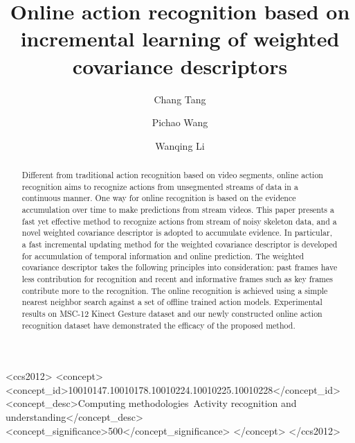 \documentclass[sigconf]{acmart}
\begin{document}
\title{Online action recognition based on incremental learning of weighted covariance descriptors}

\author{Chang Tang}

\author{Pichao Wang}

\author{Wanqing Li}





\begin{abstract}
Different from traditional action recognition based on video segments, online action recognition aims to recognize actions from unsegmented streams of data in a continuous manner.  One way for online recognition is based on the evidence accumulation over time to make predictions from stream videos. This paper presents a fast yet effective method to recognize actions from stream of noisy skeleton data, and a novel weighted covariance descriptor is adopted to accumulate evidence. In particular, a fast incremental updating method for the weighted covariance descriptor is developed for accumulation of temporal information and online prediction. The weighted covariance descriptor takes the following principles into consideration:  past frames have less contribution for recognition and recent and informative frames such as key frames contribute more to the recognition. The online recognition is achieved using a simple nearest neighbor search against a set of offline trained action models. Experimental results on MSC-12 Kinect Gesture dataset and our newly constructed online action recognition dataset have demonstrated the efficacy of the proposed method.
\end{abstract}

 \begin{CCSXML}
<ccs2012>
<concept>
<concept_id>10010147.10010178.10010224.10010225.10010228</concept_id>
<concept_desc>Computing methodologies~Activity recognition and understanding</concept_desc>
<concept_significance>500</concept_significance>
</concept>
</ccs2012>
\end{CCSXML}
\end{document}
